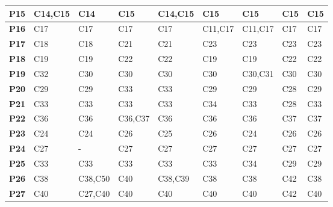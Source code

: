 \begin{longtable}{|M{1.0cm}|M{1.5cm}|M{1.5cm}|M{1.5cm}|M{1.5cm}|M{1.5cm}|M{1.5cm}|M{1.5cm}|M{1.5cm}|}
\textbf{P15} & C14,C15        & C14            & C15            & C14,C15         & C15            & C15            & C15            & C15            \\ \hline
\textbf{P16} & C17            & C17            & C17            & C17             & C11,C17        & C11,C17        & C17            & C17            \\ \hline
\textbf{P17} & C18            & C18            & C21            & C21             & C23            & C23            & C23            & C23            \\ \hline
\textbf{P18} & C19            & C19            & C22            & C22             & C19            & C19            & C22            & C22            \\ \hline
\textbf{P19} & C32            & C30            & C30            & C30             & C30            & C30,C31        & C30            & C30            \\ \hline
\textbf{P20} & C29            & C29            & C33            & C33             & C29            & C29            & C28            & C29            \\ \hline
\textbf{P21} & C33            & C33            & C33            & C33             & C34            & C33            & C28            & C33            \\ \hline
\textbf{P22} & C36            & C36            & C36,C37        & C36             & C36            & C36            & C37            & C37            \\ \hline
\textbf{P23} & C24            & C24            & C26            & C25             & C26            & C24            & C26            & C26            \\ \hline
\textbf{P24} & C27            & -              & C27            & C27             & C27            & C27            & C27            & C27            \\ \hline
\textbf{P25} & C33            & C33            & C33            & C33             & C33            & C34            & C29            & C29            \\ \hline
\textbf{P26} & C38            & C38,C50        & C40            & C38,C39         & C38            & C38            & C42            & C38            \\ \hline
\textbf{P27} & C40            & C27,C40        & C40            & C40             & C40            & C40            & C42            & C40            \\ \hline

\end{longtable}
